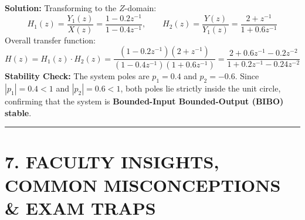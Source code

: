 \documentclass[11pt,a4paper]{article}
\begin{document}
\noindent\textbf{Solution:}
Transforming to the $Z$-domain:
\begin{equation}
H_1(z) = \frac{Y_1(z)}{X(z)} = \frac{1 - 0.2 z^{-1}}{1 - 0.4 z^{-1}}, \qquad H_2(z) = \frac{Y(z)}{Y_1(z)} = \frac{2 + z^{-1}}{1 + 0.6 z^{-1}}
\end{equation}
Overall transfer function:
\begin{equation}
H(z) = H_1(z) \cdot H_2(z) = \frac{(1 - 0.2 z^{-1})(2 + z^{-1})}{(1 - 0.4 z^{-1})(1 + 0.6 z^{-1})} = \frac{2 + 0.6 z^{-1} - 0.2 z^{-2}}{1 + 0.2 z^{-1} - 0.24 z^{-2}}
\end{equation}
\textbf{Stability Check:} The system poles are $p_1 = 0.4$ and $p_2 = -0.6$. Since $|p_1| = 0.4 < 1$ and $|p_2| = 0.6 < 1$, both poles lie strictly inside the unit circle, confirming that the system is \textbf{Bounded-Input Bounded-Output (BIBO) stable}.

\noindent\rule{\textwidth}{0.5pt}

\section{7. FACULTY INSIGHTS, COMMON MISCONCEPTIONS \& EXAM TRAPS}
\end{document}
